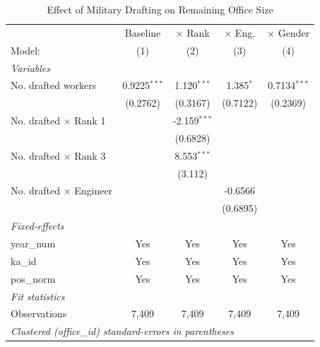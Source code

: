 \begin{table}[htbp]
\centering
\caption{Effect of Military Drafting on Remaining Office Size}
\label{tab:headcount}
\begin{threeparttable}
\begin{tabular}{lcccc}
   \tabularnewline \midrule \midrule
                                  & Baseline       & $\times$ Rank  & $\times$ Eng.  & $\times$ Gender \\    
   Model:                         & (1)            & (2)            & (3)            & (4)\\  
   \midrule
   \emph{Variables}\\
   No. drafted workers            & 0.9225$^{***}$ & 1.120$^{***}$  & 1.385$^{*}$    & 0.7134$^{***}$\\   
                                  & (0.2762)       & (0.3167)       & (0.7122)       & (0.2369)\\   
   No. drafted $\times$ Rank 1    &                & -2.159$^{***}$ &                &   \\   
                                  &                & (0.6828)       &                &   \\   
   No. drafted $\times$ Rank 3    &                & 8.553$^{***}$  &                &   \\   
                                  &                & (3.112)        &                &   \\   
   No. drafted $\times$ Engineer  &                &                & -0.6566        &   \\   
                                  &                &                & (0.6895)       &   \\   
   \midrule
   \emph{Fixed-effects}\\
   year\_num                      & Yes            & Yes            & Yes            & Yes\\  
   ka\_id                         & Yes            & Yes            & Yes            & Yes\\  
   pos\_norm                      & Yes            & Yes            & Yes            & Yes\\  
   \midrule
   \emph{Fit statistics}\\
   Observations                   & 7,409          & 7,409          & 7,409          & 7,409\\  
   \midrule \midrule
   \multicolumn{5}{l}{\emph{Clustered (office\_id) standard-errors in parentheses}}\\

\end{tabular}
\end{threeparttable}
\end{table}
